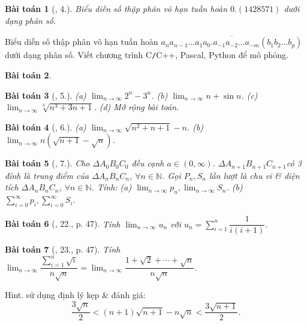 \documentclass[oneside]{book}
\newtheorem{baitoan}{Bài toán}
\begin{document}
\begin{baitoan}[\cite{TLCT_dai_so_giai_tich_11}, 4.]
	Biểu diễn số thập phân vô hạn tuần hoàn $0.(1428571)$ dưới dạng phân số.
\end{baitoan}
	Biểu diễn số thập phân vô hạn tuần hoàn $\overline{a_na_{n-1}\ldots a_1a_0.a_{-1}a_{-2}\ldots a_{-m}(b_1b_2\ldots b_p)}$ dưới dạng phân số. Viết chương trình {\sf C{\tt/}C++, Pascal, Python} để mô phỏng.
\begin{baitoan}
	
\end{baitoan}

\begin{baitoan}[\cite{TLCT_dai_so_giai_tich_11}, 5.]
	(a) $\lim_{n\to\infty} 2^n - 3^n$. (b) $\lim_{n\to\infty} n + \sin n$. (c) $\lim_{n\to\infty} \sqrt[3]{n^3 + 3n + 1}$. (d) Mở rộng bài toán.
\end{baitoan}

\begin{baitoan}[\cite{TLCT_dai_so_giai_tich_11}, 6.]
	(a) $\lim_{n\to\infty} \sqrt{n^2 + n + 1} - n$. (b) $\lim_{n\to\infty} n(\sqrt{n + 1} - \sqrt{n})$.
\end{baitoan}

\begin{baitoan}[\cite{TLCT_dai_so_giai_tich_11}, 7.]
	Cho $\Delta A_0B_0C_0$ đều cạnh $a\in(0,\infty)$. $\Delta A_{n+1}B_{n+1}C_{n+1}$có 3 đỉnh là trung điểm của $\Delta A_nB_nC_n$, $\forall n\in\mathbb{N}$. Gọi $P_n,S_n$ lần lượt là chu vi \& diện tích $\Delta A_nB_nC_n$, $\forall n\in\mathbb{N}$. Tính: (a) $\lim_{n\to\infty} p_n,\lim_{n\to\infty} S_n$. (b) $\sum_{i=0}^\infty p_i,\sum_{i=0}^\infty S_i$.
\end{baitoan}

\begin{baitoan}[\cite{TLCT_BT_dai_so_giai_tich_11}, 22., p. 47]
	Tính $\lim_{n\to\infty} u_n$ với $u_n = \sum_{i=1}^n \dfrac{1}{i(i + 1)}$.
\end{baitoan}

\begin{baitoan}[\cite{TLCT_BT_dai_so_giai_tich_11}, 23., p. 47]
	Tính $\lim_{n\to\infty} \dfrac{\sum_{i=1}^n \sqrt{i}}{n\sqrt{n}} = \lim_{n\to\infty} \dfrac{1 + \sqrt{2} + \cdots + \sqrt{n}}{n\sqrt{n}}$.
\end{baitoan}
{\sf Hint.} sử dụng định lý kẹp \& đánh giá:
\begin{equation*}
	\frac{3\sqrt{n}}{2} < (n + 1)\sqrt{n + 1} - n\sqrt{n} < \frac{3\sqrt{n + 1}}{2}.
\end{equation*}
\end{document}
